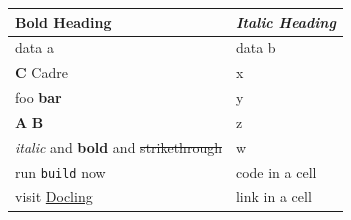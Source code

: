 \documentclass[11pt,a4paper]{article}
\begin{document}
\begin{table}[h]
\begin{tabular}{|l|l|}
\hline
\textbf{Bold Heading} & \textit{Italic Heading} \\ \hline
data a & data b \\ \hline
\textbf{C} Cadre & x \\ \hline
foo \textbf{bar} & y \\ \hline
\textbf{A} \textbf{B} & z \\ \hline
\textit{italic} and \textbf{bold} and \sout{strikethrough} & w \\ \hline
run \texttt{build} now & code in a cell \\ \hline
visit \href{https://github.com/docling-project/docling}{Docling} & link in a cell \\ \hline
\end{tabular}
\end{table}
\end{document}
